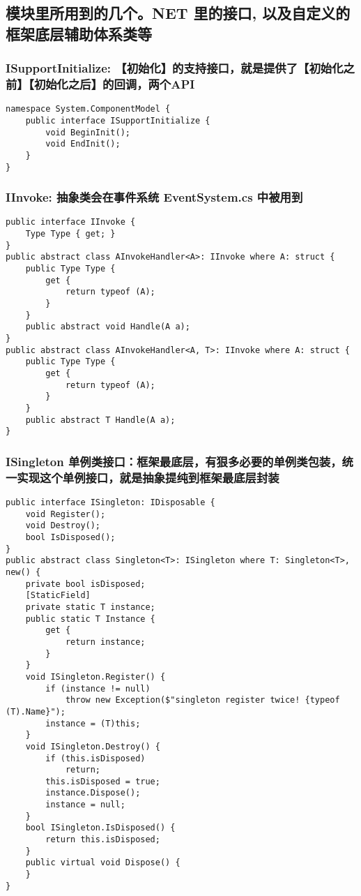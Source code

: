 \documentclass[9pt, b5paper]{article}
\begin{document}
\subsection{模块里所用到的几个。NET 里的接口, 以及自定义的框架底层辅助体系类等}
\label{sec-6-1}
\subsubsection{ISupportInitialize: 【初始化】的支持接口，就是提供了【初始化之前】【初始化之后】的回调，两个API}
\label{sec-6-1-1}
\begin{verbatim}
namespace System.ComponentModel {
    public interface ISupportInitialize {
        void BeginInit();
        void EndInit();
    }
}
\end{verbatim}
\subsubsection{IInvoke: 抽象类会在事件系统 EventSystem.cs 中被用到}
\label{sec-6-1-2}
\begin{verbatim}
public interface IInvoke {
    Type Type { get; }
}
public abstract class AInvokeHandler<A>: IInvoke where A: struct {
    public Type Type {
        get {
            return typeof (A);
        }
    }
    public abstract void Handle(A a);
}
public abstract class AInvokeHandler<A, T>: IInvoke where A: struct {
    public Type Type {
        get {
            return typeof (A);
        }
    }
    public abstract T Handle(A a);
}
\end{verbatim}
\subsubsection{ISingleton 单例类接口：框架最底层，有狠多必要的单例类包装，统一实现这个单例接口，就是抽象提纯到框架最底层封装}
\label{sec-6-1-3}
\begin{verbatim}
public interface ISingleton: IDisposable {
    void Register();
    void Destroy();
    bool IsDisposed();
}
public abstract class Singleton<T>: ISingleton where T: Singleton<T>, new() {
    private bool isDisposed;
    [StaticField]
    private static T instance;
    public static T Instance {
        get {
            return instance;
        }
    }
    void ISingleton.Register() {
        if (instance != null) 
            throw new Exception($"singleton register twice! {typeof (T).Name}");
        instance = (T)this;
    }
    void ISingleton.Destroy() {
        if (this.isDisposed) 
            return;
        this.isDisposed = true;
        instance.Dispose();
        instance = null;
    }
    bool ISingleton.IsDisposed() {
        return this.isDisposed;
    }
    public virtual void Dispose() {
    }
}
\end{verbatim}
\end{document}
